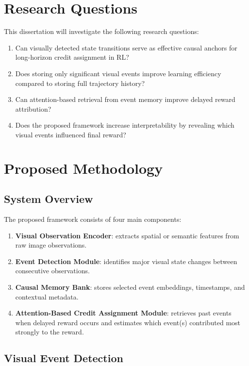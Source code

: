 \documentclass[12pt,a4paper]{article}
\begin{document}
\section{Research Questions}

This dissertation will investigate the following research questions:

\begin{enumerate}[label=\arabic*.]
    \item Can visually detected state transitions serve as effective causal anchors for long-horizon credit assignment in RL?
    \item Does storing only significant visual events improve learning efficiency compared to storing full trajectory history?
    \item Can attention-based retrieval from event memory improve delayed reward attribution?
    \item Does the proposed framework increase interpretability by revealing which visual events influenced final reward?
\end{enumerate}

\section{Proposed Methodology}

\subsection{System Overview}

The proposed framework consists of four main components:

\begin{enumerate}[label=\alph*.]
    \item \textbf{Visual Observation Encoder}: extracts spatial or semantic features from raw image observations.
    \item \textbf{Event Detection Module}: identifies major visual state changes between consecutive observations.
    \item \textbf{Causal Memory Bank}: stores selected event embeddings, timestamps, and contextual metadata.
    \item \textbf{Attention-Based Credit Assignment Module}: retrieves past events when delayed reward occurs and estimates which event(s) contributed most strongly to the reward.
\end{enumerate}

\subsection{Visual Event Detection}
\end{document}
